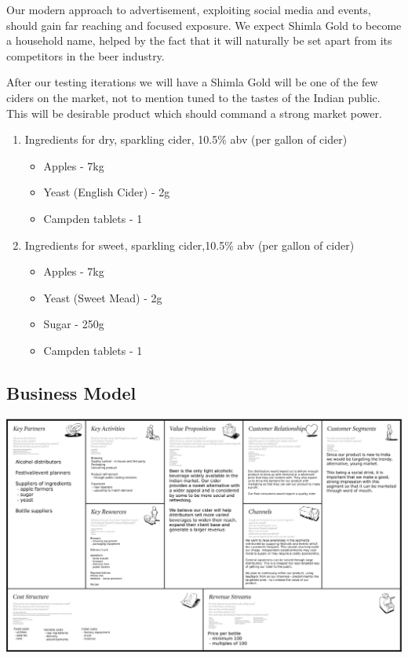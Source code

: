 \documentclass[11pt]{article}
\begin{document}
Our modern approach to advertisement, exploiting social media and events, should 
gain far reaching and focused exposure. We expect Shimla Gold to become a
household name, helped by the fact that it will naturally be set apart from its
competitors in the beer industry. 

After our testing iterations we will 
have a Shimla Gold will be one of the few ciders on the market, not to mention 
tuned to the tastes of the Indian public. This will be desirable product which 
should command a strong market power.

  \begin{enumerate}
    \item Ingredients for dry, sparkling cider, 10.5\% abv (per gallon of cider)
	  \begin{itemize}
	   \item Apples - 7kg
	   \item Yeast (English Cider) - 2g
	   \item Campden tablets - 1
       \end{itemize}
	\item Ingredients for sweet, sparkling cider,10.5\% abv (per gallon of cider)
	  \begin{itemize}
	  \item Apples - 7kg
	  \item Yeast (Sweet Mead) - 2g
	  \item Sugar - 250g
	  \item Campden tablets - 1
	  \end{itemize}
	\end{enumerate}

  \newpage
  \subsection{Business Model}
  \includegraphics[angle=90,width=\textwidth,height=\textheight,keepaspectratio]{./business_model_canvas_poster.png}
\end{document}
